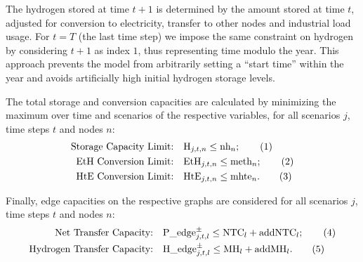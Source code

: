\documentclass[smallextended,natbib]{svjour3}       %
\numberwithin{definition}{section}
\numberwithin{theorem}{section}
\numberwithin{proposition}{section}
\begin{document}
The hydrogen stored at time $t+1$ is determined by the amount stored at time $t$, adjusted for conversion to electricity, transfer to other nodes and industrial load usage.
For $t=T$ (the last time step) we impose the same constraint on hydrogen by considering $t+1$ as index $1$, thus representing time modulo the year.
This approach prevents the model from arbitrarily setting a “start time” within the year and avoids artificially high initial hydrogen storage levels.

The total storage and conversion capacities are calculated by minimizing the maximum over time and scenarios of the respective variables, for all scenarios \(j\), time steps \(t\) and nodes \(n\):
\begin{align*}
    \text{Storage Capacity Limit:} \quad & \text{H}_{j,t,n} \leq \text{nh}_n ;\stepcounter{equation}\tag{\theequation}\label{constr_nh}\\
    \text{EtH Conversion Limit:} \quad & \text{EtH}_{j,t,n} \leq \text{meth}_n; \stepcounter{equation}\tag{\theequation}\label{constr_meth}\\
    \text{HtE Conversion Limit:} \quad & \text{HtE}_{j,t,n} \leq \text{mhte}_n .\stepcounter{equation}\tag{\theequation}\label{constr_mhte}
\end{align*}

Finally, edge capacities on the respective graphs are considered for all scenarios \(j\), time steps \(t\) and nodes \(n\):
\begin{align*}
    \text{Net Transfer Capacity:} \quad & \text{P\_edge}^\pm_{j,t,l}\le\text{NTC}_l + \text{addNTC}_l ;\stepcounter{equation}\tag{\theequation}\label{constr_NTC}\\
    \text{Hydrogen Transfer Capacity:} \quad & \text{H\_edge}^\pm_{j,t,l}\le\text{MH}_l + \text{addMH}_l.\stepcounter{equation}\tag{\theequation}\label{constr_MH}
\end{align*}













\end{document}
